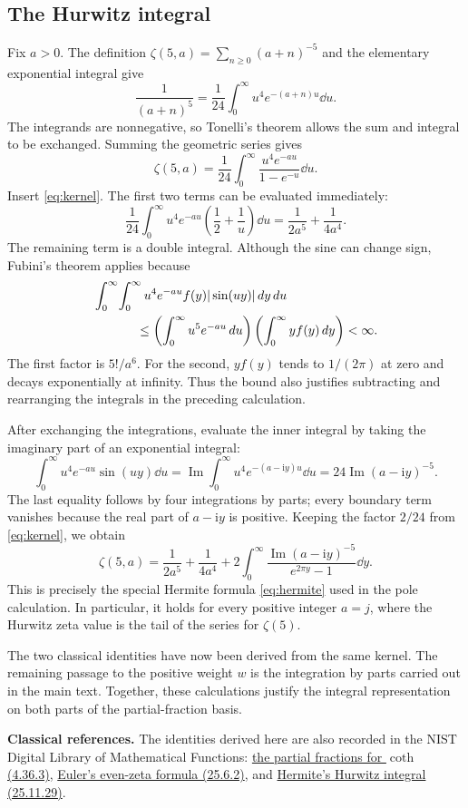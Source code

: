 \subsection{The Hurwitz integral}

Fix $a>0$. The definition
$\zeta(5,a)=\sum_{n\geq0}(a+n)^{-5}$ and the elementary exponential
integral give
\[
 \frac1{(a+n)^5}=\frac1{24}
       \int_0^\infty u^4e^{-(a+n)u}\dd u.
\]
The integrands are nonnegative, so Tonelli's theorem allows the sum and
integral to be exchanged. Summing the geometric series gives
\[
 \zeta(5,a)=\frac1{24}
       \int_0^\infty\frac{u^4e^{-au}}{1-e^{-u}}\dd u.
\]
Insert \eqref{eq:kernel}. The first two terms can be evaluated immediately:
\[
 \frac1{24}\int_0^\infty u^4e^{-au}
       \left(\frac12+\frac1u\right)\dd u
       =\frac1{2a^5}+\frac1{4a^4}.
\]
The remaining term is a double integral. Although the sine can change
sign, Fubini's theorem applies because
\begin{align*}
 &\int_0^\infty\!\int_0^\infty
       u^4e^{-au}f(y)|\sin(uy)|\dd y\dd u\\
 &\hspace{12mm}\leq
       \left(\int_0^\infty u^5e^{-au}\dd u\right)
       \left(\int_0^\infty yf(y)\dd y\right)<\infty.
\end{align*}
The first factor is $5!/a^6$. For the second, $yf(y)$ tends to
$1/(2\pi)$ at zero and decays exponentially at infinity. Thus the bound
also justifies subtracting and rearranging the integrals in the preceding
calculation.

After exchanging the integrations, evaluate the inner integral by taking
the imaginary part of an exponential integral:
\[
 \int_0^\infty u^4e^{-au}\sin(uy)\dd u
 =\operatorname{Im}\int_0^\infty
       u^4e^{-(a-\mathrm i y)u}\dd u
 =24\operatorname{Im}(a-\mathrm i y)^{-5}.
\]
The last equality follows by four integrations by parts; every boundary
term vanishes because the real part of $a-\mathrm i y$ is positive.
Keeping the factor $2/24$ from \eqref{eq:kernel}, we obtain
\[
 \boxed{\zeta(5,a)=\frac1{2a^5}+\frac1{4a^4}
 +2\int_0^\infty
   \frac{\operatorname{Im}(a-\mathrm i y)^{-5}}{e^{2\pi y}-1}\dd y.}
\]
This is precisely the special Hermite formula \eqref{eq:hermite} used in
the pole calculation. In particular, it holds for every positive integer
$a=j$, where the Hurwitz zeta value is the tail of the series for
$\zeta(5)$.

The two classical identities have now been derived from the same kernel.
The remaining passage to the positive weight $w$ is the integration by
parts carried out in the main text. Together, these calculations justify
the integral representation on both parts of the partial-fraction basis.

\bigskip
{\small\textbf{Classical references.}
The identities derived here are also recorded in the NIST Digital Library
of Mathematical Functions:
\href{https://dlmf.nist.gov/4.36.E3}{the partial fractions for $\coth$ (4.36.3)},
\href{https://dlmf.nist.gov/25.6.E2}{Euler's even-zeta formula (25.6.2)}, and
\href{https://dlmf.nist.gov/25.11.E29}{Hermite's Hurwitz integral (25.11.29)}.}
